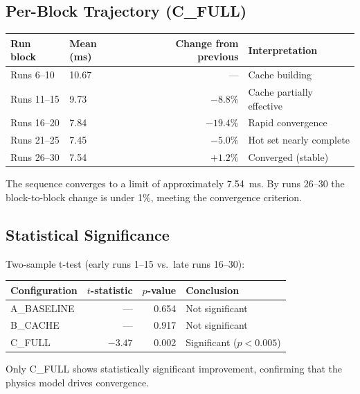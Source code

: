 \subsection{Per-Block Trajectory (C\_FULL)}

\begin{center}
\begin{tabular}{llrl}
\toprule
Run block & Mean (ms) & Change from previous & Interpretation \\
\midrule
Runs 6--10  & 10.67 & --- & Cache building \\
Runs 11--15 & 9.73  & $-8.8\%$  & Cache partially effective \\
Runs 16--20 & 7.84  & $-19.4\%$ & Rapid convergence \\
Runs 21--25 & 7.45  & $-5.0\%$  & Hot set nearly complete \\
Runs 26--30 & 7.54  & $+1.2\%$  & Converged (stable) \\
\bottomrule
\end{tabular}
\end{center}

The sequence converges to a limit of approximately 7.54~ms. By runs 26--30 the
block-to-block change is under 1\%, meeting the convergence criterion.

\subsection{Statistical Significance}

Two-sample t-test (early runs 1--15 vs.\ late runs 16--30):

\begin{center}
\begin{tabular}{lrrl}
\toprule
Configuration & $t$-statistic & $p$-value & Conclusion \\
\midrule
A\_BASELINE & --- & 0.654 & Not significant \\
B\_CACHE    & --- & 0.917 & Not significant \\
C\_FULL     & $-3.47$ & 0.002 & Significant ($p < 0.005$) \\
\bottomrule
\end{tabular}
\end{center}

Only C\_FULL shows statistically significant improvement, confirming that the physics
model drives convergence.

